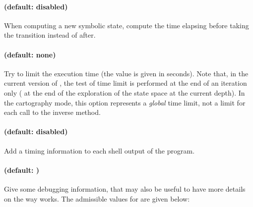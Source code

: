 \paragraph{ (default: disabled)}
When computing a new symbolic state, compute the time elapsing before taking the transition instead of after.




\paragraph{ (default: none)}
Try to limit the execution time (the value  is given in seconds).
Note that, in the current version of \imitator{}, the test of time limit is performed at the end of an iteration only (\ie{} at the end of the exploration of the state space at the current depth).
In the cartography mode, this option represents a \emph{global} time limit, not a limit for each call to the inverse method.


\paragraph{ (default: disabled)}
Add a timing information to each shell output of the program.






\paragraph{ (default: )}

Give some debugging information, that may also be useful to have more details on the way \imitator{} works.
The admissible values for  are given below:

